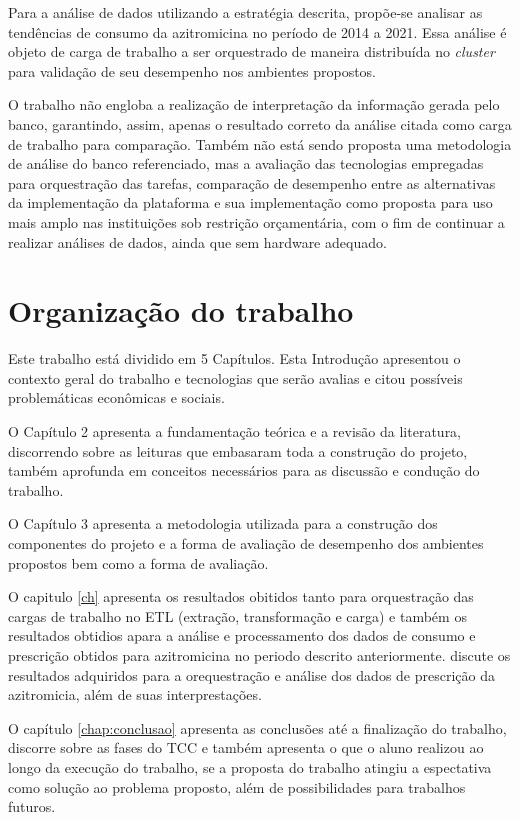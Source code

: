 Para a análise de dados utilizando a estratégia descrita, propõe-se analisar as tendências de consumo da azitromicina no período de 2014 a 2021. Essa análise é objeto de carga de trabalho a ser orquestrado de maneira distribuída no \emph{cluster} para validação de seu desempenho nos ambientes propostos.

O trabalho não engloba a realização de interpretação da informação gerada pelo banco, garantindo, assim, apenas o resultado correto da análise citada como carga de trabalho para comparação. Também não está sendo proposta uma metodologia de análise do banco referenciado, mas a avaliação das tecnologias empregadas para orquestração das tarefas, comparação de desempenho entre as alternativas da implementação da plataforma e sua implementação como proposta para uso mais amplo nas instituições sob restrição orçamentária, com o fim de continuar a realizar análises de dados, ainda que sem hardware adequado.


\section{Organização do trabalho}
\label{sec:organizacaoTrabalho}

Este trabalho está dividido em 5 Capítulos. Esta Introdução apresentou o contexto geral do trabalho e tecnologias que serão avalias e citou possíveis problemáticas econômicas e sociais. 

O Capítulo 2 apresenta a fundamentação teórica e a revisão da literatura, discorrendo sobre as leituras que embasaram toda a construção do projeto, também aprofunda em conceitos necessários para as discussão e condução do trabalho. 

O Capítulo 3 apresenta a  metodologia utilizada para a construção dos componentes do projeto e a forma de avaliação de desempenho dos ambientes propostos bem como a forma de avaliação. 

O capitulo \ref{ch} apresenta os resultados obitidos tanto para orquestração das cargas de trabalho no ETL (extração, transformação e carga) e também os resultados obtidios apara a análise e processamento dos dados de consumo e prescrição obtidos para azitromicina no periodo descrito anteriormente.
discute os resultados adquiridos para a orequestração e análise dos dados de prescrição da azitromicia, além de suas interprestações. 

O capítulo \ref{chap:conclusao} apresenta as conclusões até a finalização do trabalho, discorre sobre as fases do TCC e também apresenta o que o aluno realizou ao longo da execução do trabalho, se a proposta do trabalho atingiu a espectativa como solução ao problema  proposto, além de possibilidades para trabalhos futuros. 